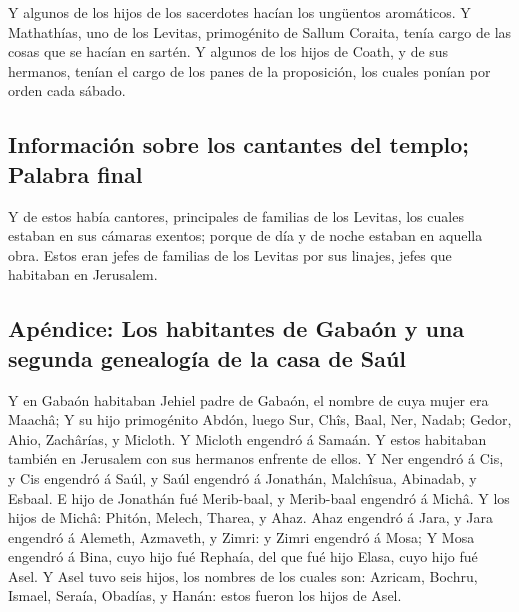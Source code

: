  Y algunos de los hijos de los sacerdotes hacían los
ungüentos aromáticos.  Y Mathathías, uno de los Levitas,
primogénito de Sallum Coraita, tenía cargo de las cosas que se hacían en
sartén.  Y algunos de los hijos de Coath, y de sus
hermanos, tenían el cargo de los panes de la proposición, los cuales
ponían por orden cada sábado.

\hypertarget{informaciuxf3n-sobre-los-cantantes-del-templo-palabra-final}{%
\subsection{Información sobre los cantantes del templo; Palabra
final}\label{informaciuxf3n-sobre-los-cantantes-del-templo-palabra-final}}

 Y de estos había cantores, principales de familias de los
Levitas, los cuales estaban en sus cámaras exentos; porque de día y de
noche estaban en aquella obra.  Estos eran jefes de
familias de los Levitas por sus linajes, jefes que habitaban en
Jerusalem.

\hypertarget{apuxe9ndice-los-habitantes-de-gabauxf3n-y-una-segunda-genealoguxeda-de-la-casa-de-sauxfal}{%
\subsection{Apéndice: Los habitantes de Gabaón y una segunda genealogía
de la casa de
Saúl}\label{apuxe9ndice-los-habitantes-de-gabauxf3n-y-una-segunda-genealoguxeda-de-la-casa-de-sauxfal}}

 Y en Gabaón habitaban Jehiel padre de Gabaón, el nombre de
cuya mujer era Maachâ;  Y su hijo primogénito Abdón, luego
Sur, Chîs, Baal, Ner, Nadab;  Gedor, Ahio, Zachârías, y
Micloth.  Y Micloth engendró á Samaán. Y estos habitaban
también en Jerusalem con sus hermanos enfrente de ellos.  Y
Ner engendró á Cis, y Cis engendró á Saúl, y Saúl engendró á Jonathán,
Malchîsua, Abinadab, y Esbaal.  E hijo de Jonathán fué
Merib-baal, y Merib-baal engendró á Michâ.  Y los hijos de
Michâ: Phitón, Melech, Tharea, y Ahaz.  Ahaz engendró á
Jara, y Jara engendró á Alemeth, Azmaveth, y Zimri: y Zimri engendró á
Mosa;  Y Mosa engendró á Bina, cuyo hijo fué Rephaía, del
que fué hijo Elasa, cuyo hijo fué Asel.  Y Asel tuvo seis
hijos, los nombres de los cuales son: Azricam, Bochru, Ismael, Seraía,
Obadías, y Hanán: estos fueron los hijos de Asel.

